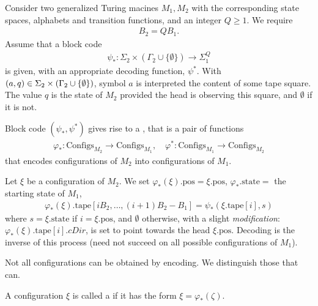 \documentclass[12pt]{memoir}
\newcommand{\fld}[1]{\ensuremath{\textit{#1}}}
\def\B{B}
\newcommand{\Configs}{\mathrm{Configs}}
\newcommand{\pos}{\mathrm{pos}}
\newcommand{\cDir}{\fld{cDir}}
\newcommand{\state}{\mathrm{state}}
\newcommand{\tape}{\mathrm{tape}}
\begin{document}
\begin{definition}\label{def:configuration-code}
Consider two generalized Turing macines \( M_{1},M_{2} \) with the corresponding
state spaces, alphabets and transition functions, and an integer \( Q\ge 1 \).
We require
\begin{align}\label{eq:B_2-B_1-Q}
  \B_{2} = Q \B_{1}.
\end{align}
Assume that a block code
\begin{align*}
   \psi_{*}:\Sigma_{2}\times(\Gamma_{2}\cup\{\emptyset\})\to\Sigma_{1}^{Q}
 \end{align*}
is given, with an appropriate decoding function, \( \psi^{*} \).
With \( (a,q)\in\Sigma_{2}\times(\Gamma_{2}\cup\{\emptyset\}) \),
symbol \( a \) is interpreted the content of some tape square.
The value \( q \) is the state of \( M_{2} \) provided the head is observing this square,
and \( \emptyset \) if it is not.

Block code \( (\psi_{*},\psi^{*}) \) gives rise to a 
, that is a pair of functions
    \begin{align*}
        \varphi_{*} :\Configs_{M_2} \to \Configs_{M_1},
        \quad
        \varphi^{*}:\Configs_{M_1} \to \Configs_{M_2}
    \end{align*}
    that encodes configurations of \( M_2 \) into configurations of \( M_{1} \).

Let \( \xi \) be a configuration of \( M_2 \).
We set \( \varphi_*(\xi).\pos = \xi.\pos \), \(\varphi_{*}.\state=  \) 
the starting state of \( M_{1} \),
\begin{align*}
 \varphi_*(\xi).\tape[i\B_2, \dots, (i+1)\B_2 - \B_1] = \psi_*(\xi.\tape[i], s)
 \end{align*}
where \( s=\xi.\state \) if \( i = \xi.\pos \), and \( \emptyset \) otherwise, with
a slight \emph{modification}: 
\( \varphi_*(\xi).\tape[i].\cDir \), is set to point towards the head \( \xi.\pos \).
Decoding is the inverse of this process (need not succeed on all possible configurations
of \( M_{1} \)).
 \end{definition}

 Not all configurations can be obtained by encoding.
 We distinguish those that can.

 \begin{definition}\label{def:code-config}
   A configuration \( \xi \) is called a  if 
it has the form \( \xi=\varphi_{*}(\zeta) \).
 \end{definition}
\end{document}
